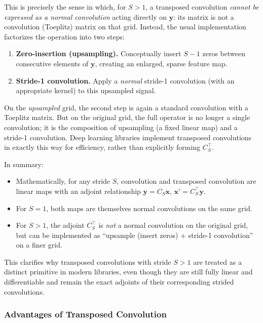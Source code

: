 \noindent
This is precisely the sense in which, for \(S>1\), a transposed convolution \emph{cannot be expressed as a normal convolution} acting directly on \(\mathbf{y}\): its matrix is not a convolution (Toeplitz) matrix on that grid. Instead, the usual implementation factorizes the operation into two steps:

\begin{enumerate}
	\item \textbf{Zero-insertion (upsampling).} Conceptually insert \(S-1\) zeros between consecutive elements of \(\mathbf{y}\), creating an enlarged, sparse feature map.
	\item \textbf{Stride-1 convolution.} Apply a \emph{normal} stride-1 convolution (with an appropriate kernel) to this upsampled signal.
\end{enumerate}

\noindent
On the \emph{upsampled} grid, the second step is again a standard convolution with a Toeplitz matrix. But on the original grid, the full operator is no longer a single convolution; it is the composition of upsampling (a fixed linear map) and a stride-1 convolution. Deep learning libraries implement transposed convolutions in exactly this way for efficiency, rather than explicitly forming \(C_S^\top\).

\medskip

\noindent
In summary:

\begin{itemize}
	\item Mathematically, for any stride \(S\), convolution and transposed convolution are linear maps with an adjoint relationship \(\mathbf{y} = C_S \mathbf{x}\), \(\mathbf{x}' = C_S^\top \mathbf{y}\).
	\item For \(S=1\), both maps are themselves normal convolutions on the same grid.
	\item For \(S>1\), the adjoint \(C_S^\top\) is \emph{not} a normal convolution on the original grid, but can be implemented as ``upsample (insert zeros) + stride-1 convolution'' on a finer grid.
\end{itemize}

\noindent
This clarifies why transposed convolutions with stride \(S>1\) are treated as a distinct primitive in modern libraries, even though they are still fully linear and differentiable and remain the exact adjoints of their corresponding strided convolutions.

\subsubsection{Advantages of Transposed Convolution}

